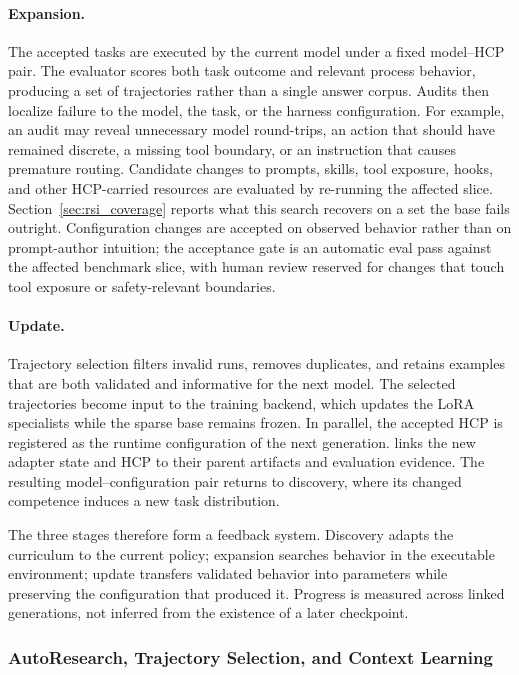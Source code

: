 \paragraph{Expansion.}
The accepted tasks are executed by the current model under a fixed model--HCP pair. The evaluator scores both task outcome and relevant process behavior, producing a set of trajectories rather than a single answer corpus. Audits then localize failure to the model, the task, or the harness configuration. For example, an audit may reveal unnecessary model round-trips, an action that should have remained discrete, a missing tool boundary, or an instruction that causes premature routing. Candidate changes to prompts, skills, tool exposure, hooks, and other HCP-carried resources are evaluated by re-running the affected slice. Section~\ref{sec:rsi_coverage} reports what this search recovers on a set the base fails outright. Configuration changes are accepted on observed behavior rather than on prompt-author intuition; the acceptance gate is an automatic eval pass against the affected benchmark slice, with human review reserved for changes that touch tool exposure or safety-relevant boundaries.

\paragraph{Update.}
Trajectory selection filters invalid runs, removes duplicates, and retains examples that are both validated and informative for the next model. The selected trajectories become input to the training backend, which updates the LoRA specialists while the sparse base remains frozen. In parallel, the accepted HCP is registered as the runtime configuration of the next generation. \mindforge{} links the new adapter state and HCP to their parent artifacts and evaluation evidence. The resulting model--configuration pair returns to discovery, where its changed competence induces a new task distribution.

The three stages therefore form a feedback system. Discovery adapts the curriculum to the current policy; expansion searches behavior in the executable environment; update transfers validated behavior into parameters while preserving the configuration that produced it. Progress is measured across linked generations, not inferred from the existence of a later checkpoint.

\subsubsection{AutoResearch, Trajectory Selection, and Context Learning}
\label{sec:rsi_autoresearch}

